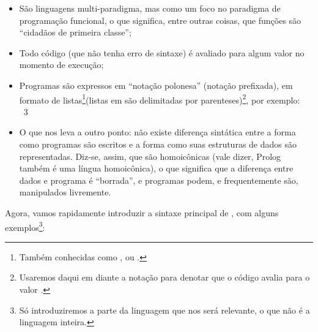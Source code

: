 \documentclass{article}
\begin{document}
\begin{itemize}
\item São linguagens multi-paradigma, mas como um
  foco no paradigma de programação funcional, o que significa, entre
  outras coisas, que  funções são ``cidadãos de primeira classe'';
\item Todo código  (que não tenha erro de sintaxe) é avaliado para
  algum valor no momento de execução;
\item Programas são expressos em ``notação polonesa'' (notação prefixada), em formato de
  listas\footnote{Também conhecidas como , ou
    .}(listas em  são delimitadas por
  parenteses)\footnote{Usaremos daqui em diante a notação
     para denotar que o código
     avalia para o valor .}, por exemplo:
  \\
   \seta\ 3
\item O que nos leva a outro ponto: não existe diferença
  sintática entre a forma como programas  são escritos
  e a forma como suas estruturas de dados são representadas. Diz-se,
  assim, que  são homoicônicas (vale dizer, Prolog
  também é uma língua homoicônica), o que significa que a diferença
  entre dados e programa é ``borrada'', e programas podem, e
  frequentemente são, manipulados livremente.
\end{itemize}

Agora, vamos rapidamente introduzir a sintaxe principal de
, com alguns exemplos\footnote{Só
  introduziremos a parte da linguagem que nos será relevante, o que
  não é a linguagem inteira.}:
\end{document}
